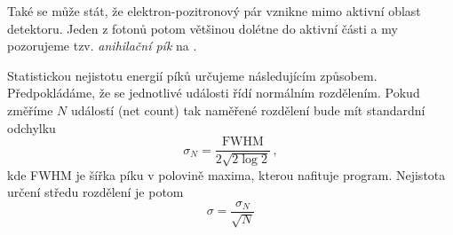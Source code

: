 Také se může stát, že elektron-pozitronový pár vznikne mimo aktivní oblast detektoru. Jeden z fotonů potom většinou dolétne do aktivní části a my pozorujeme tzv. \emph{anihilační pík} na .



Statistickou nejistotu energií píků určujeme následujícím způsobem. Předpokládáme, že se jednotlivé události řídí normálním rozdělením. Pokud změříme $N$ událostí (net count) tak naměřené rozdělení bude mít standardní odchylku
\begin{equation}
\sigma_N=\frac{\text{FWHM}}{2\sqrt{2\log2}} \,,
\end{equation}
kde FWHM je šířka píku v polovině maxima, kterou nafituje program.
Nejistota určení středu rozdělení je potom
\begin{equation}
\sigma=\frac{\sigma_N}{\sqrt{N}}
\end{equation}